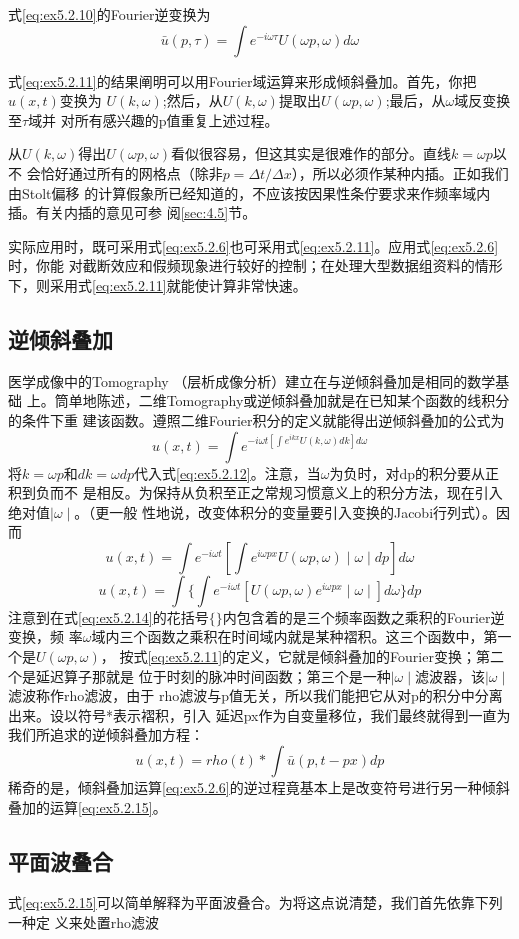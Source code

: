 式\ref{eq:ex5.2.10}的Fourier逆变换为
\begin{equation}
\bar{u}(p,\tau)=\int e^{-i\omega \tau}U(\omega p,\omega)d\omega
\label{eq:ex5.2.11}
\end{equation}

式\ref{eq:ex5.2.11}的结果阐明可以用Fourier域运算来形成倾斜叠加。首先，你把$u(x,t)$变换为
$U(k,\omega)$;然后，从$U(k,\omega)$提取出$U(\omega p,\omega)$;最后，从$\omega$域反变换至$\tau$域并
对所有感兴趣的p值重复上述过程。

从$U(k,\omega)$得出$U(\omega p,\omega)$看似很容易，但这其实是很难作的部分。直线$k=\omega p$以不
会恰好通过所有的网格点（除非$p=\Delta t/\Delta x$），所以必须作某种内插。正如我们由Stolt偏移
的计算假象所已经知道的，不应该按因果性条佇要求来作频率域内插。有关内插的意见可参
阅\ref{sec:4.5}节。

实际应用时，既可采用式\ref{eq:ex5.2.6}也可采用式\ref{eq:ex5.2.11}。应用式\ref{eq:ex5.2.6}时，你能
对截断效应和假频现象进行较好的控制；在处理大型数据组资料的情形下，则采用式\ref{eq:ex5.2.11}就能使计算非常快速。

\subsection{逆倾斜叠加}
\label{sec:5.2.7}

医学成像中的Tomography
（层析成像分析）建立在与逆倾斜叠加是相同的数学基础
上。筒单地陈述，二维Tomography或逆倾斜叠加就是在已知某个函数的线积分的条件下重
建该函数。遵照二维Fourier积分的定义就能得出逆倾斜叠加的公式为
\begin{equation}
u(x,t)=\int e^{-i\omega t[\int e^{ikx}U(k,\omega)dk]d\omega}
\label{eq:ex5.2.12}
\end{equation}
将$k=\omega p$和$dk=\omega dp$代入式\ref{eq:ex5.2.12}。注意，当$\omega$为负时，对dp的积分要从正积到负而不
是相反。为保持从负积至正之常规习惯意义上的积分方法，现在引入绝对值$\mid\omega\mid$。（更一般
性地说，改变体积分的变量要引入变换的Jacobi行列式）。因而
\begin{equation}
u(x,t)=\int e^{-i\omega t}[\int e^{i\omega px}U(\omega p,\omega)\mid\omega\mid dp]d\omega
\label{eq:ex5.2.13}
\end{equation}
\begin{equation}
u(x,t)=\int\{\int e^{-i\omega t}[U(\omega p,\omega) e^{i\omega px}\mid\omega\mid ]d\omega\}dp
\label{eq:ex5.2.14}
\end{equation}
注意到在式\ref{eq:ex5.2.14}的花括号$\{\}$内包含着的是三个频率函数之乘积的Fourier逆变换，频
率$\omega$域内三个函数之乘积在时间域内就是某种褶积。这三个函数中，第一个是$U(\omega p,\omega)$，
按式\ref{eq:ex5.2.11}的定义，它就是倾斜叠加的Fourier变换；第二个是延迟算子那就是
位于时刻的脉冲时间函数；第三个是一种$\mid \omega \mid$滤波器，该$\mid \omega \mid$滤波称作rho滤波，由于
rho滤波与p值无关，所以我们能把它从对p的积分中分离出来。设以符号*表示褶积，引入
延迟px作为自变量移位，我们最终就得到一直为我们所追求的逆倾斜叠加方程：
\begin{equation}
u(x,t)=rho(t)*\int \bar{u}(p,t-px)dp
\label{eq:ex5.2.15}
\end{equation}
稀奇的是，倾斜叠加运算\ref{eq:ex5.2.6}的逆过程竟基本上是改变符号进行另一种倾斜叠加的运算\ref{eq:ex5.2.15}。

\subsection{平面波叠合}
\label{sec:5.2.8}

式\ref{eq:ex5.2.15}可以简单解释为平面波叠合。为将这点说清楚，我们首先依靠下列一种定
义来处置rho滤波
